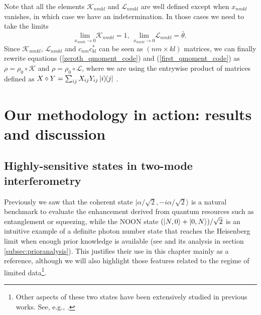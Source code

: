 Note that all the elements $\mathcal{K}_{nmkl}$ and $\mathcal{L}_{nmkl}$ are well defined except when $x_{nmkl}$ vanishes, in which case we have an indetermination. In those cases we need to take the limits
\begin{equation}
\underset{x_{nmlk}\rightarrow 0}{\mathrm{lim}} \mathcal{K}_{nmkl}=1 ,~~\underset{x_{nmkl}\rightarrow 0}{\mathrm{lim}} \mathcal{L}_{nmkl}=\bar{\theta}.
\label{singularcases}
\end{equation}
Since $\mathcal{K}_{nmkl}$, $\mathcal{L}_{nmkl}$ and $c_{nm}c^{*}_{kl}$ can be seen as $(nm \times kl)$ matrices, we can finally rewrite equations (\ref{zeroth_qmoment_code}) and (\ref{first_qmoment_code}) as $\rho = \rho_0 \circ \mathcal{K}$ and $\rho = \rho_0 \circ \mathcal{L}$, where we are using the entrywise product of matrices defined as $X \circ Y = \sum_{ij} X_{ij} Y_{ij}\ketbra{i}{j}$ \cite{horn1985}.

\section{Our methodology in action: results and discussion}
\label{sec:methodlimited}

\subsection{Highly-sensitive states in two-mode interferometry}
\label{employed_states}

Previously we saw that the coherent state $|\alpha/\sqrt{2},-i\alpha/\sqrt{2}\rangle$ is a natural benchmark to evaluate the enhancement derived from quantum resources such as entanglement or squeezing, while the NOON state $(\ket{N,0} + \ket{0,N})/\sqrt{2}$ is an intuitive example of a definite photon number state that reaches the Heisenberg limit \cite{dowling2008} when enough prior knowledge is available (see \cite{berry2012infinite, hall2012} and its analysis in section \ref{subsec:prioranalysis}). This justifies their use in this chapter mainly as a reference, although we will also highlight those features related to the regime of limited data\footnote{Other aspects of these two states have been extensively studied in previous works. See, e.g., \cite{kolodynski2014, jarzyna2016thesis, hall2012, berry2012infinite}.}.

